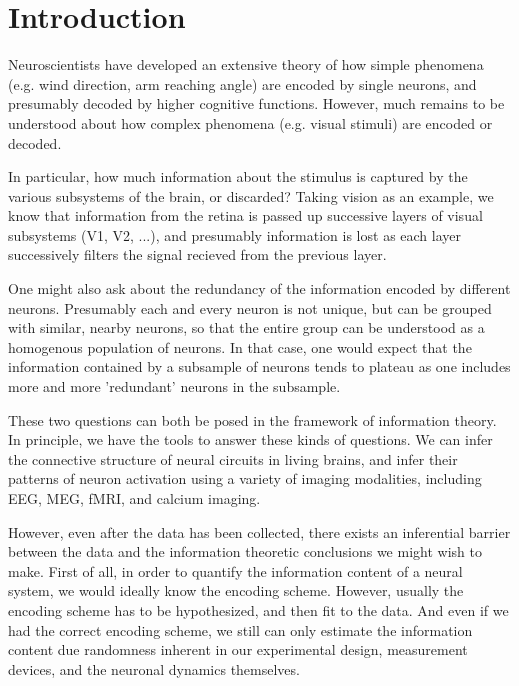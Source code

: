 \documentclass[12pt]{article}
\begin{document}
\maketitle

\newcommand{\tr}{\text{tr}}
\newcommand{\E}{\textbf{E}}
\newcommand{\diag}{\text{diag}}
\newcommand{\argmax}{\text{argmax}}
\newcommand{\Cov}{\text{Cov}}
\newcommand{\Var}{\text{Var}}
\newcommand{\argmin}{\text{argmin}}
\newcommand{\Vol}{\text{Vol}}
\newcommand{\comm}[1]{}

\section{Introduction}

Neuroscientists have developed an extensive theory of how simple
phenomena (e.g. wind direction, arm reaching angle) are encoded by
single neurons, and presumably decoded by higher cognitive functions.
However, much remains to be understood about how complex phenomena
(e.g. visual stimuli) are encoded or decoded.

In particular, how much information about the stimulus is captured by
the various subsystems of the brain, or discarded?  Taking vision as
an example, we know that information from the retina is passed up
successive layers of visual subsystems (V1, V2, ...), and presumably
information is lost as each layer successively filters the signal
recieved from the previous layer.

One might also ask about the redundancy of the information encoded by
different neurons.  Presumably each and every neuron is not unique,
but can be grouped with similar, nearby neurons, so that the entire
group can be understood as a homogenous population of neurons.  In
that case, one would expect that the information contained by a
subsample of neurons tends to plateau as one includes more and more
'redundant' neurons in the subsample.

These two questions can both be posed in the framework of information
theory.  In principle, we have the tools to answer these kinds of
questions.  We can infer the connective structure of neural circuits
in living brains, and infer their patterns of neuron activation using
a variety of imaging modalities, including EEG, MEG, fMRI, and calcium
imaging.

However, even after the data has been collected, there exists an
inferential barrier between the data and the information theoretic
conclusions we might wish to make.  First of all, in order to quantify
the information content of a neural system, we would ideally know the
encoding scheme.  However, usually the encoding scheme has to be
hypothesized, and then fit to the data.  And even if we had the
correct encoding scheme, we still can only estimate the information
content due randomness inherent in our experimental design,
measurement devices, and the neuronal dynamics themselves.
\end{document}
